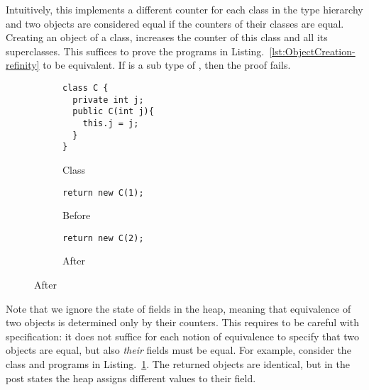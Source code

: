 Intuitively, this implements a different counter for each class in the type hierarchy and two objects are considered equal if the counters of their classes are equal.
Creating an object of a class, increases the counter of this class and all its superclasses.
This suffices to prove the programs in Listing.~\ref{lst:ObjectCreation-refinity} to be equivalent. If  is a sub type of , then the proof fails.

\begin{figure}[tbp]
\centering
\begin{subfigure}[b]{.3\linewidth}
\begin{lstlisting}[style=refinity]
class C {
  private int j;
  public C(int j){
    this.j = j;
  }
}
\end{lstlisting}
\caption{Class}
\end{subfigure}\hspace{3mm}
\begin{subfigure}[b]{.3\linewidth}
\begin{lstlisting}[style=refinity]
return new C(1);
\end{lstlisting}
\caption{Before}
\end{subfigure}\hspace{3mm}
\begin{subfigure}[b]{.3\linewidth}
\begin{lstlisting}[style=refinity]
return new C(2);
\end{lstlisting}
    \caption{After}
  \end{subfigure}
\label{lst:ObjectCreation-refinity-2}
\end{figure}

Note that we ignore the state of fields in the heap, meaning that equivalence of two objects is determined only by their counters. 
This requires to be careful with specification: it does not suffice for each notion of equivalence to specify that two objects are equal, but also \emph{their} fields must be equal.
For example, consider the class and programs in Listing.~\ref{lst:ObjectCreation-refinity-2}.
The returned objects are identical, but in the post states the heap assigns different values to their field.


